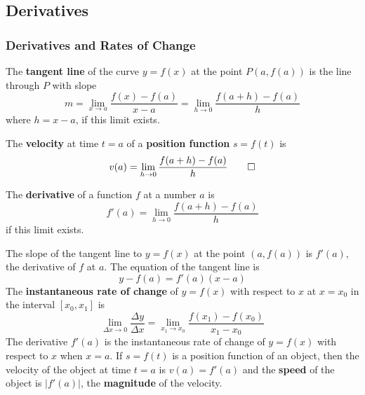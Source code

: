\subsection{Derivatives}
\subsubsection{Derivatives and Rates of Change}
\begin{definition}
    The \textbf{tangent line} of the curve \(y=f(x)\) at the point \(P(a, f(a))\)
    is the line through \(P\) with slope
    \[m=\lim_{x\to a}\frac{f(x)-f(a)}{x-a}=\lim_{h\to 0}\frac{f(a+h)-f(a)}{h}\]
    where \(h=x-a\), if this limit exists.
\end{definition}
\begin{definition}
    The \textbf{velocity} at time \(t=a\) of a \textbf{position function}
    \(s=f(t)\) is \[v(a)=\lim_{h\to 0}\frac{f(a+h)-f(a)}{h}\qedhere\]
\end{definition}
\begin{definition}
    The \textbf{derivative} of a function \(f\) at a number \(a\) is
    \[f'(a)=\lim_{h\to 0}\frac{f(a+h)-f(a)}{h}\] if this limit exists.
\end{definition}
The slope of the tangent line to \(y=f(x)\) at the point \((a,f(a))\) is
\(f'(a)\), the derivative of \(f\) at \(a\).
The equation of the tangent line is \[y-f(a)=f'(a)(x-a)\]
The \textbf{instantaneous rate of change} of \(y=f(x)\) with respect to \(x\)
at \(x=x_0\) in the interval \([x_0,x_1]\) is
\[\lim_{\Delta x\to 0}\frac{\Delta y}{\Delta x}
=\lim_{x_1 \to x_0}\frac{f(x_1)-f(x_0)}{x_1-x_0}\]
The derivative \(f'(a)\) is the instantaneous rate of change of \(y=f(x)\)
with respect to \(x\) when \(x=a\).
If \(s=f(t)\) is a position function of an object, then the velocity of the
object at time \(t=a\) is \(v(a)=f'(a)\) and the \textbf{speed} of the
object is \(|f'(a)|\), the \textbf{magnitude} of the velocity.

